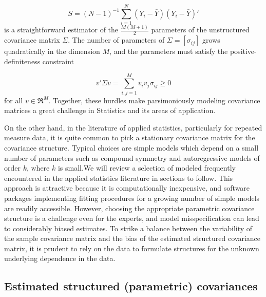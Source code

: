 \documentclass[12pt]{article}
\theoremstyle{definition}
\begin{document}
\begin{equation} \label{eq:sample-covariance-matrix}
S = \left(N-1\right)^{-1} \sum_{i = 1}^N \left(Y_i - \bar{Y}\right)\left(Y_i - \bar{Y}\right)'
\end{equation}
\noindent
is a straightforward estimator of the $\frac{M\left(M+1\right)}{2}$ parameters of the unstructured covariance matrix $\Sigma$. The number of parameters of $\Sigma = \left[ \sigma_{ij} \right]$ grows quadratically in the dimension $M$, and the parameters must satisfy the positive-definiteness constraint

\begin{equation} \label{eq:positive-definite-constraint} 
v'\Sigma v = \sum_{i,j = 1}^M v_i v_j \sigma_{ij} \ge 0 
\end{equation}
\noindent
for all $v \in \Re^M$. Together, these hurdles make parsimoniously modeling covariance matrices a great challenge in Statistics and its areas of application.

\bigskip

On the other hand, in the literature of applied statistics, particularly for repeated measure data, it is quite common to pick a stationary covariance matrix for the covariance structure. Typical choices are simple models which depend on a small number of parameters such as compound symmetry and autoregressive models of order $k$, where $k$ is small.We will review a selection of modeled frequently encountered in the applied statistics literature in sections to follow. This approach is attractive because it is computationally inexpensive, and software packages implementing fitting procedures for a growing number of simple models are readily accessible. However, choosing the appropriate parametric covariance structure is a challenge even for the experts, and model misspecification can lead to considerably biased estimates. To strike a balance between the variability of the sample covariance matrix and the bias of the estimated structured covariance matrix, it is prudent to rely on the data to formulate structures for the unknown underlying dependence in the data.


\bigskip

\subsection{Estimated structured (parametric) covariances}
\end{document}

